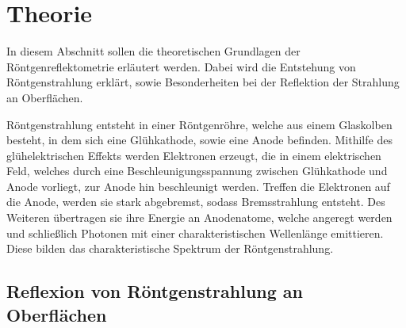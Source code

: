 \section{Theorie}
\label{sec:theorie}

In diesem Abschnitt sollen die theoretischen Grundlagen der Röntgenreflektometrie erläutert werden.
Dabei wird die Entstehung von Röntgenstrahlung erklärt,
sowie Besonderheiten bei der Reflektion der Strahlung an Oberflächen.

Röntgenstrahlung entsteht in einer Röntgenröhre,
welche aus einem Glaskolben besteht,
in dem sich eine Glühkathode,
sowie eine Anode befinden.
Mithilfe des glühelektrischen Effekts werden Elektronen erzeugt,
die in einem elektrischen Feld,
welches durch eine Beschleunigungsspannung zwischen Glühkathode und Anode vorliegt,
zur Anode hin beschleunigt werden.
Treffen die Elektronen auf die Anode,
werden sie stark abgebremst,
sodass Bremsstrahlung entsteht.
Des Weiteren übertragen sie ihre Energie an Anodenatome,
welche angeregt werden und schließlich Photonen mit einer charakteristischen Wellenlänge emittieren.
Diese bilden das charakteristische Spektrum der Röntgenstrahlung.

\subsection{Reflexion von Röntgenstrahlung an Oberflächen}

